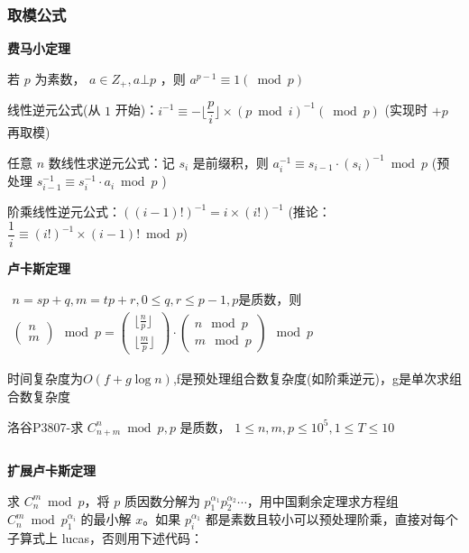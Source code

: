 \documentclass[twocolumn,10pt]{ctexart}
\makeatletter
\newcommand{\hfive}[1]{\par\addvspace{6pt}\@afterindentfalse
  {\noindent\bfseries\normalsize #1}\par\nobreak\vspace{2pt}}
\newcommand{\Omicron}{O}
\makeatother
\begin{document}
\inputminted{cpp}{code/p5656_exgcd.cpp}

\inputminted{cpp}{code/p5656_exgcd2.cpp}

\subsubsection{取模公式}

\hfive{费马小定理}

若 $p$ 为素数， $a\in Z_+,a\bot p$ ，则 $a^{p-1}\equiv 1(\bmod p)$

线性逆元公式(从 $1$ 开始)：$i^{-1}\equiv-\lfloor\dfrac pi\rfloor\times(p\bmod i)^{-1}(\bmod p)$   (实现时 $+p$ 再取模)

任意 $n$ 数线性求逆元公式：记 $s_i$ 是前缀积，则 $a_i^{-1}\equiv s_{i-1}\cdot (s_i)^{-1}\bmod p$ (预处理 $s_{i-1}^{-1}\equiv s_i^{-1}\cdot a_i\bmod p$ )

阶乘线性逆元公式：$((i-1)!)^{-1}=i\times(i!)^{-1}$  (推论： $\dfrac 1i\equiv({i!})^{-1}\times(i-1)!\bmod p$)

\hfive{卢卡斯定理}

\begin{adjustbox}{max width=\linewidth,center}
$\begin{gathered}
n=sp+q,m=tp+r,0\le q,r\le p-1,p\text{是质数，则}\\
\begin{pmatrix}n\\m\end{pmatrix}\mod p=
\begin{pmatrix}\lfloor\frac np\rfloor\\\lfloor\frac mp\rfloor\end{pmatrix}
\cdot\begin{pmatrix}n\mod p\\m\mod p\end{pmatrix}\mod p
\end{gathered}$
\end{adjustbox}

时间复杂度为$\Omicron(f+g\log n)$,f是预处理组合数复杂度(如阶乘逆元)，g是单次求组合数复杂度

\begin{notebox}
洛谷P3807-求 $C_{n+m}^n\bmod p,p$ 是质数， $1\le n,m,p\le10^5,1\le T\le10$
\end{notebox}

\inputminted{cpp}{code/p3807_lucas.cpp}

\textbf{扩展卢卡斯定理}

求 $C_n^m\bmod p$，将 $p$ 质因数分解为 $p_1^{\alpha_1}p_2^{\alpha_2}\cdots$，用中国剩余定理求方程组 $C_n^m\bmod p_1^{\alpha_i}$ 的最小解 $x$。如果 $p_i^{\alpha_1}$ 都是素数且较小可以预处理阶乘，直接对每个子算式上 lucas，否则用下述代码：
\end{document}
